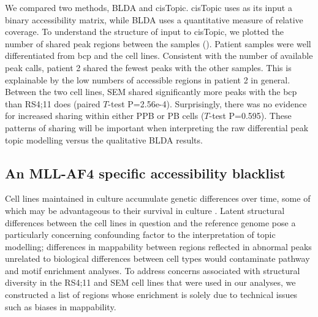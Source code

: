 We compared two methods, BLDA and cisTopic. cisTopic uses as its input a binary accessibility matrix, while BLDA uses a quantitative measure of relative coverage. To understand the structure of input to cisTopic, we plotted the number of shared peak regions between the samples (). Patient samples were well differentiated from \gls{bcp} and the cell lines. Consistent with the number of available peak calls, patient 2 shared the fewest peaks with the other samples. This is explainable by the low numbers of accessible regions in patient 2 in general. Between the two cell lines, SEM shared significantly more peaks with the \gls{bcp} than RS4;11 does (paired $T$-test P=2.56e-4). Surprisingly, there was no evidence for increased sharing within either PPB or PB cells ($T$-test P=0.595). These patterns of sharing will be important when interpreting the raw differential peak topic modelling versus the qualitative BLDA results.

\subsection{An MLL-AF4 specific accessibility blacklist} \label{mll_blacklist}

Cell lines maintained in culture accumulate genetic differences over time, some of which may be advantageous to their survival in culture \cite{Liu2019}. 
Latent structural differences between the cell lines in question and the reference genome pose a particularly concerning confounding factor to the interpretation of topic modelling; differences in mappability between regions reflected in abnormal peaks unrelated to biological differences between cell types would contaminate pathway and motif enrichment analyses. 
To address concerns associated with structural diversity in the RS4;11 and SEM cell lines that were used in our analyses, we constructed a list of regions whose enrichment is solely due to technical issues such as biases in mappability.

